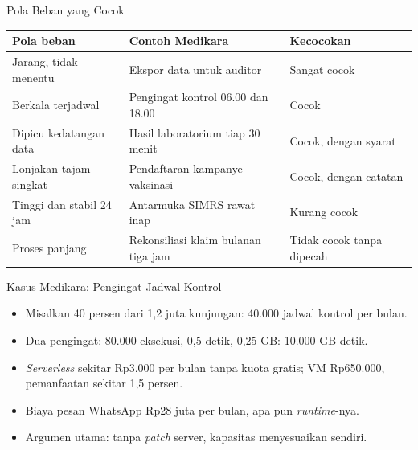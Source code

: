 \documentclass[aspectratio=169, table, 12pt]{beamer}
\begin{document}
\begin{frame}{{\Large Pola Beban yang Cocok}}
  \scriptsize
  \begin{tabularx}{\textwidth}{>{\raggedright\arraybackslash}p{3.2cm}
      >{\raggedright\arraybackslash}X >{\raggedright\arraybackslash}p{3.2cm}}
    \hline
    \textbf{Pola beban} & \textbf{Contoh Medikara} & \textbf{Kecocokan} \\
    \hline
    Jarang, tidak menentu & Ekspor data untuk auditor & Sangat cocok \\
    \hline
    Berkala terjadwal & Pengingat kontrol 06.00 dan 18.00 & Cocok \\
    \hline
    Dipicu kedatangan data & Hasil laboratorium tiap 30 menit & Cocok, dengan
      syarat \\
    \hline
    Lonjakan tajam singkat & Pendaftaran kampanye vaksinasi & Cocok, dengan
      catatan \\
    \hline
    Tinggi dan stabil 24 jam & Antarmuka SIMRS rawat inap & Kurang cocok \\
    \hline
    Proses panjang & Rekonsiliasi klaim bulanan tiga jam & Tidak cocok tanpa
      dipecah \\
    \hline
  \end{tabularx}
\end{frame}

\begin{frame}{{\Large Kasus Medikara: Pengingat Jadwal Kontrol}}
  \vspace{6pt}
  \begin{itemize}
    \item Misalkan 40 persen dari 1,2 juta kunjungan: 40.000 jadwal kontrol
          per bulan.
    \item Dua pengingat: 80.000 eksekusi, 0,5 detik, 0,25 GB: 10.000
          GB-detik.
    \item \textit{Serverless} sekitar Rp3.000 per bulan tanpa kuota gratis;
          VM Rp650.000, pemanfaatan sekitar 1,5 persen.
    \item Biaya pesan WhatsApp Rp28 juta per bulan, apa pun
          \textit{runtime}-nya.
    \item Argumen utama: tanpa \textit{patch} server, kapasitas menyesuaikan
          sendiri.
  \end{itemize}
\end{frame}
\end{document}
